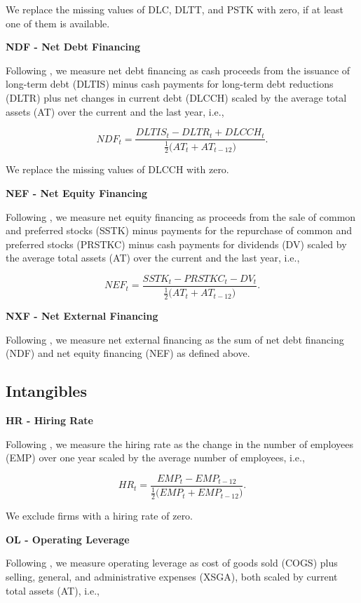 \documentclass[
  article]{jss}
\begin{document}
We replace the missing values of DLC, DLTT, and PSTK with zero, if at
least one of them is available.

\textbf{NDF - Net Debt Financing}

Following \citet{bradshaw.2006}, we measure net debt financing as cash
proceeds from the issuance of long-term debt (DLTIS) minus cash payments
for long-term debt reductions (DLTR) plus net changes in current debt
(DLCCH) scaled by the average total assets (AT) over the current and the
last year, i.e.,

\[
NDF_{t} = \frac{DLTIS_{t} - DLTR_{t} + DLCCH_{t}}{\frac{1}{2} \big(AT_{t} + AT_{t-12} \big)}\text{.}
\]

We replace the missing values of DLCCH with zero.

\textbf{NEF - Net Equity Financing}

Following \citet{bradshaw.2006}, we measure net equity financing as
proceeds from the sale of common and preferred stocks (SSTK) minus
payments for the repurchase of common and preferred stocks (PRSTKC)
minus cash payments for dividends (DV) scaled by the average total
assets (AT) over the current and the last year, i.e.,

\[
NEF_{t} = \frac{SSTK_{t} - PRSTKC_{t} - DV_{t}}{\frac{1}{2} \big(AT_{t} + AT_{t-12} \big)}\text{.}
\]

\textbf{NXF - Net External Financing}

Following \citet{bradshaw.2006}, we measure net external financing as
the sum of net debt financing (NDF) and net equity financing (NEF) as
defined above.

\subsection{Intangibles}\label{intangibles}

\textbf{HR - Hiring Rate}

Following \citet{belo.2014}, we measure the hiring rate as the change in
the number of employees (EMP) over one year scaled by the average number
of employees, i.e.,

\[
HR_{t} = \frac{EMP_{t} - EMP_{t-12}}{\frac{1}{2} \big(EMP_{t} + EMP_{t-12} \big)}\text{.}
\]

We exclude firms with a hiring rate of zero.

\textbf{OL - Operating Leverage}

Following \citet{novy-marx.2011}, we measure operating leverage as cost
of goods sold (COGS) plus selling, general, and administrative expenses
(XSGA), both scaled by current total assets (AT), i.e.,
\end{document}
